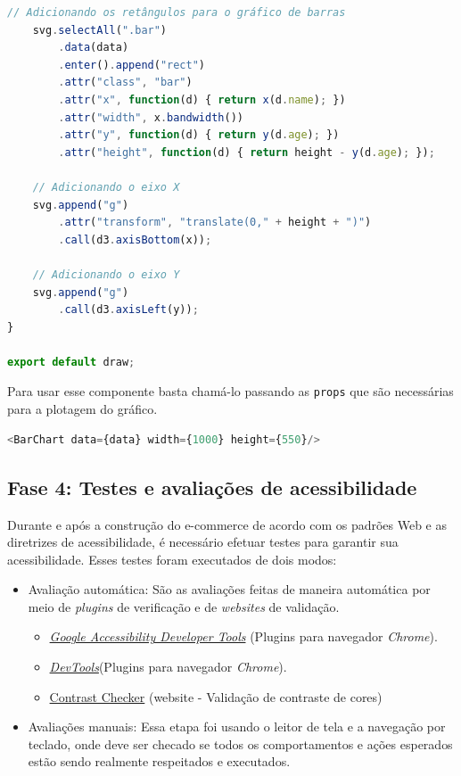 {{{{\begin{lstlisting}[language=javascript,caption=exemplo de um componente de gráfico]
    // Adicionando os retângulos para o gráfico de barras
    svg.selectAll(".bar")
        .data(data)
        .enter().append("rect")
        .attr("class", "bar")
        .attr("x", function(d) { return x(d.name); })
        .attr("width", x.bandwidth())
        .attr("y", function(d) { return y(d.age); })
        .attr("height", function(d) { return height - y(d.age); });

    // Adicionando o eixo X
    svg.append("g")
        .attr("transform", "translate(0," + height + ")")
        .call(d3.axisBottom(x));

    // Adicionando o eixo Y
    svg.append("g")
        .call(d3.axisLeft(y));
}

export default draw;
\end{lstlisting}}

}

}

Para usar esse componente basta chamá-lo passando as \lstinline{props} que são necessárias para a plotagem do gráfico.
\begin{lstlisting}[language=javascript, caption=Usando um componente reutilizável]
<BarChart data={data} width={1000} height={550}/>
\end{lstlisting}

}
\subsection{Fase 4: Testes e avaliações de acessibilidade}
{Durante e após a construção do e-commerce de acordo com os
padrões Web e as diretrizes de acessibilidade, é necessário efetuar testes para garantir sua acessibilidade. Esses testes foram executados de dois modos: 
\begin{itemize}
\item Avaliação automática: São as avaliações feitas de maneira automática por meio de \textit{plugins} de verificação e de \textit{websites} de validação.
\begin{itemize}
\item \href{https://chrome.google.com/webstore/detail/accessibility-developer-t/fpkknkljclfencbdbgkenhalefipecmb?hl=pt-BR}{\textit{Google Accessibility Developer Tools}} ({Plugins} para navegador \textit{Chrome}).
\item \href{https://developer.chrome.com/docs/devtools/}{\textit{DevTools}}({Plugins} para navegador \textit{Chrome}).
\item \href{https://contrastchecker.com/}{Contrast Checker} (website - Validação de contraste de cores)
\end{itemize}
\item Avaliações manuais: Essa etapa foi usando o leitor de tela e a navegação por teclado, onde deve ser checado se todos os comportamentos e ações esperados estão sendo realmente respeitados e executados.
\end{itemize}
}

